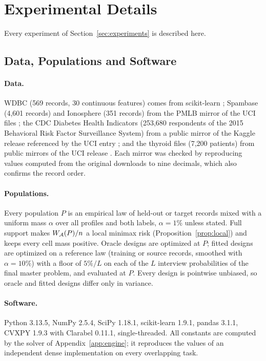 \section{Experimental Details}\label{app:F}
Every experiment of Section~\ref{sec:experiments} is described here.

\subsection{Data, Populations and Software}\label{app:capsens}
\paragraph{Data.}
WDBC (569 records, 30 continuous features) comes from scikit-learn \citep{wolberg1993}; Spambase (4,601 records) and Ionosphere (351 records) from the PMLB mirror of the UCI files \citep{spambase1999,ionosphere1989,romano2021pmlb}; the CDC Diabetes Health Indicators (253,680 respondents of the 2015 Behavioral Risk Factor Surveillance System) from a public mirror of the Kaggle release referenced by the UCI entry \citep{cdcdiabetes2017}; and the thyroid files (7,200 patients) from public mirrors of the UCI release \citep{quinlan1986thyroid}. Each mirror was checked by reproducing values computed from the original downloads to nine decimals, which also confirms the record order.

\paragraph{Populations.}
Every population $P$ is an empirical law of held-out or target records mixed with a uniform mass $\alpha$ over all profiles and both labels, $\alpha=1\%$ unless stated. Full support makes $W_\mathcal A(P)/n$ a local minimax risk (Proposition~\ref{prop:local}) and keeps every cell mass positive. Oracle designs are optimized at $P$; fitted designs are optimized on a reference law (training or source records, smoothed with $\alpha=10\%$) with a floor of $5\%/L$ on each of the $L$ interview probabilities of the final master problem, and evaluated at $P$. Every design is pointwise unbiased, so oracle and fitted designs differ only in variance.

\paragraph{Software.}
Python 3.13.5, NumPy 2.5.4, SciPy 1.18.1, scikit-learn 1.9.1, pandas 3.1.1, CVXPY 1.9.3 with Clarabel 0.11.1, single-threaded. All constants are computed by the solver of Appendix~\ref{app:engine}; it reproduces the values of an independent dense implementation on every overlapping task.

